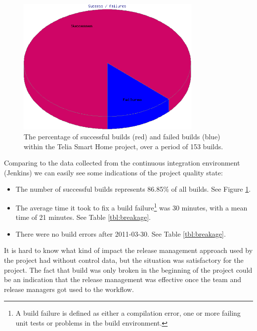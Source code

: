 \documentclass{llncs}
\begin{document}
\begin{figure}[tp]
 \begin{center}
  \includegraphics[width=0.8\textwidth]{binary-blobs/pie}
  \caption{The percentage of successful builds (red) and failed
           builds (blue) within the Telia Smart Home project, over a
           period of 153 builds.}
  \label{fig:successbuilds}
 \end{center}
\end{figure}

Comparing to the data collected from the continuous integration
environment (Jenkins) we can easily see some indications of the
project quality state:

\begin{itemize}
 \item The number of successful builds represents 86.85\% of all
       builds. See Figure \ref{fig:successbuilds}. 
 \item The average time it took to fix a build failure\footnote{
        A build failure is defined as either a compilation error, 
        one or more failing unit tests or problems in the build 
        environment.
       } was 30 minutes, with a mean time of 21 minutes. See Table
       \ref{tbl:breakage}.
 \item There were no build errors after 2011-03-30. See Table
       \ref{tbl:breakage}.
\end{itemize}

It is hard to know what kind of impact the release management approach
used by the project had without control data, but the situation was
satisfactory for the project. The fact that build was only broken in
the beginning of the project could be an indication that the release
management was effective once the team and release managers got used
to the workflow.
\end{document}
